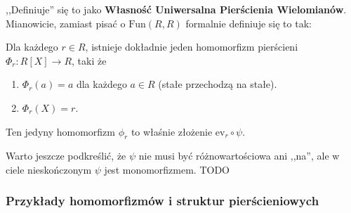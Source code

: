 ,,Definiuje'' się to jako \textbf{Własność Uniwersalna Pierścienia Wielomianów}. Mianowicie, zamiast pisać o $\text{Fun}\left( R,R \right) $ formalnie definiuje się to tak:

Dla każdego $r \in R$, istnieje dokładnie jeden homomorfizm pierścieni $\Phi_{r} : R\left[ X \right] \to R$, taki że
\begin{enumerate}[label=\arabic*)]
	\item $\Phi_{r}\left( a \right) = a$ dla każdego $a \in R$ (stałe przechodzą na stałe).
	\item $\Phi_{r}\left( X \right) = r$.
\end{enumerate}
Ten jedyny homomorfizm $\phi_{r}$ to właśnie złożenie $\text{ev}_{r} \circ \psi$.

Warto jeszcze podkreślić, że $\psi$ nie musi być różnowartościowa ani ,,na'', ale w ciele nieskończonym $\psi$ jest monomorfizmem. TODO


\subsubsection*{Przykłady homomorfizmów i struktur pierścieniowych}

